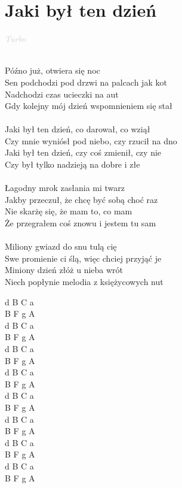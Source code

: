 \documentclass[a5paper, 10pt]{book}
\begin{document}
\section{Jaki był ten dzień}\textcolor{lightgray}{\textit{Turbo}}\\~\\
\begin{minipage}[t]{0.7\textwidth}
Późno już, otwiera się noc\\
Sen podchodzi pod drzwi na palcach jak kot\\
Nadchodzi czas ucieczki na aut\\
Gdy kolejny mój dzień wspomnieniem się stał\\
\\
\hspace*{5mm}Jaki był ten dzień, co darował, co wziął\\
\hspace*{5mm}Czy mnie wyniósł pod niebo, czy rzucił na dno\\
\hspace*{5mm}Jaki był ten dzień, czy coś zmienił, czy nie\\
\hspace*{5mm}Czy był tylko nadzieją na dobre i złe\\
\\
Łagodny mrok zasłania mi twarz\\
Jakby przeczuł, że chcę być sobą choć raz\\
Nie skarżę się, że mam to, co mam\\
Że przegrałem coś znowu i jestem tu sam\\
\\
Miliony gwiazd do snu tulą cię\\
Swe promienie ci ślą, więc chciej przyjąć je\\
Miniony dzień złóż u nieba wrót\\
Niech popłynie melodia z księżycowych nut\\

\end{minipage}
\begin{minipage}[t]{0.3\textwidth}
d B C a\\
B F g A\\
d B C a\\
B F g A\\

d B C a\\
B F g A\\
d B C a\\
B F g A\\

d B C a\\
B F g A\\
d B C a\\
B F g A\\

d B C a\\
B F g A\\
d B C a\\
B F g A\\
\end{minipage}  
\end{document}
